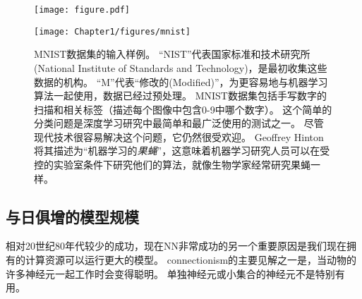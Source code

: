 \begin{figure}[!htb]
\ifOpenSource
\centerline{\texttt{[image: figure.pdf]}}
\else
\centerline{\texttt{[image: Chapter1/figures/mnist]}}
\fi
\caption{MNIST数据集的输入样例。
``NIST''代表国家标准和技术研究所(National Institute of Standards and Technology)，是最初收集这些数据的机构。
``M''代表``修改的(Modified)''，为更容易地与机器学习算法一起使用，数据已经过预处理。
MNIST数据集包括手写数字的扫描和相关标签（描述每个图像中包含0-9中哪个数字）。
这个简单的分类问题是深度学习研究中最简单和最广泛使用的测试之一。
尽管现代技术很容易解决这个问题，它仍然很受欢迎。
Geoffrey Hinton将其描述为``机器学习的\emph{果蝇}''，这意味着机器学习研究人员可以在受控的实验室条件下研究他们的算法，就像生物学家经常研究果蝇一样。
}
\label{fig:chap1_mnist}
\end{figure}


\subsection{与日俱增的模型规模}
\label{sec:increasing_model_sizes}

相对20世纪80年代较少的成功，现在\gls{NN}非常成功的另一个重要原因是我们现在拥有的计算资源可以运行更大的模型。
\gls{connectionism}的主要见解之一是，当动物的许多神经元一起工作时会变得聪明。
单独神经元或小集合的神经元不是特别有用。

